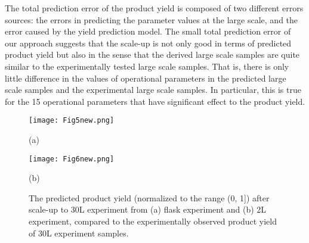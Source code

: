 \documentclass{article}
\begin{document}
The total prediction error of the product yield is composed of two different errors sources: the errors in predicting the parameter values at the large scale, and the error caused by the yield prediction model. The small total prediction error of our approach suggests that the scale-up is not only good in terms of predicted product yield but also in the sense that the derived large scale samples are quite similar to the experimentally tested large scale samples. That is, there is only little difference in the values of operational parameters in the predicted large scale samples and the experimental large scale samples. In particular, this is true for the 15 operational parameters that have significant effect to the product yield. 
                                                                                       
\begin{figure}[b]
\vspace{-5mm}

\begin{minipage}[b]{.48\linewidth}
  \centering
  \centerline{\texttt{[image: Fig5new.png]}}
  \centerline{(a)}%
  \vspace{-4mm}
\end{minipage}
\hfill
\begin{minipage}[b]{0.48\linewidth}
  \centering
  \centerline{\texttt{[image: Fig6new.png]}}
  \centerline{(b)}%
  \vspace{-4mm}
\end{minipage}

\caption{The predicted product yield (normalized to the range (0, 1]) after scale-up to 30L experiment from (a) flask experiment and (b) 2L experiment, compared to the experimentally observed product yield of 30L experiment samples.}
\label{fig:scaleuptest}
\vspace{-3mm}
\end{figure}
                                                                                        
\end{document}
